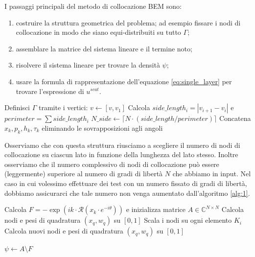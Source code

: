 \documentclass[a4paper,12pt]{article}
\theoremstyle{definition}
\begin{document}
I passaggi principali del metodo di collocazione BEM sono:
\begin{enumerate}
    \item costruire la struttura geometrica del problema; ad esempio fissare i nodi di collocazione in modo che siano equi-distribuiti su tutto $\Gamma$;
    \item assemblare la matrice del sistema lineare e il termine noto;
    \item risolvere il sistema lineare per trovare la densità $\psi$;
    \item usare la formula di rappresentazione dell'equazione \ref{eq:single_layer} per trovare l'espressione di $u^{scat}$.
\end{enumerate}

\begin{algorithm}[H]
\caption{Costruzione della Geometria}
\label{alg:1}
Definisci $\Gamma$ tramite i vertici: $v \leftarrow [v, v_1]$\;
Calcola $side\_length_i = |v_{i+1} - v_i|$ e $perimeter = \sum side\_length_i$\;
$N\_side \leftarrow \lceil N \cdot (side\_length / perimeter) \rceil$\;
Concatena $x_k, p_k, h_k, \tau_k$ eliminando le sovrapposizioni agli angoli\;
\end{algorithm}
Osserviamo che con questa struttura riusciamo a scegliere il numero di nodi di collocazione su ciascun lato in funzione della lunghezza del lato stesso. Inoltre osserviamo che il numero complessivo di nodi di collocazione può essere (leggermente) superiore al numero di gradi di libertà $N$ che abbiamo in input. Nel caso in cui volessimo effettuare dei test con un numero fissato di gradi di libertà, dobbiamo assicurarci che tale numero non venga aumentato dall'algoritmo \ref{alg:1}. 
\vspace{0.5cm}

\begin{algorithm}[H]
\caption{Assemblaggio e Risoluzione}
\label{alg:2}
Calcola $F = - \exp(i k \cdot \mathcal{R}(x_k \cdot e^{-i \theta}))$ e inizializza matrice $A \in \mathbb{C}^{N \times N}$\;
Calcola nodi e pesi di quadratura $(x_q, w_q)$ su $[0, 1]$\;
Scala i nodi su ogni elemento $K_i$\;
Calcola nuovi nodi e pesi di quadratura $(x_q, w_q)$ su $[0, 1]$\;

$\psi \leftarrow A \setminus F$ 
\end{algorithm}
\vspace{0.5cm}
\end{document}

